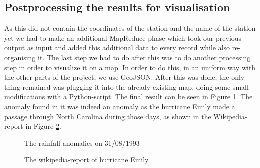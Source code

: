 \subsection{Postprocessing the results for visualisation}
As this did not contain the coordinates of the station and the name of the station yet we had to make an additional MapReduce-phase which took our previous output as input and added this additional data to every record while also re-organising it. The last step we had to do after this was to do another processing step in order to visualize it on a map. In order to do this, in an uniform way with the other parts of the project, we use GeoJSON. After this was done, the only thing remained was plugging it into the already existing map, doing some small modifications with a Python-script. The final result can be seen in Figure \ref{fig:rainfall1}. The anomaly found in it was indeed an anomaly as the hurricane Emily made a passage through North Carolina during those days, as shown in the Wikipedia-report in Figure \ref{fig:rainfall2}.
\begin{figure}[ht]
\centering
{}
\caption{The rainfall anomalies on 31/08/1993}
\label{fig:rainfall1}
\end{figure}
\begin{figure}[ht]
\centering
{}
\caption{The wikipedia-report of hurricane Emily}
\label{fig:rainfall2}
\end{figure}
